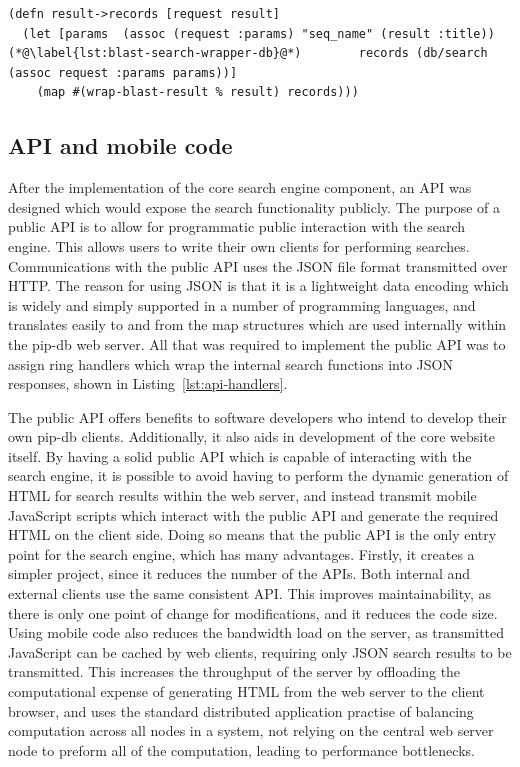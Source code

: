 \newpage


\lstset{language=clojure}
\begin{lstlisting}[label=lst:blast-search-wrapper,caption={%
      [The \textit{blast} namespace search function]
      The \textit{blast} namespace search function.}]
(defn result->records [request result]
  (let [params  (assoc (request :params) "seq_name" (result :title))
(*@\label{lst:blast-search-wrapper-db}@*)        records (db/search (assoc request :params params))]
    (map #(wrap-blast-result % result) records)))
\end{lstlisting}


\subsection{API and mobile code}\label{subsec:api}

After the implementation of the core search engine component, an API
was designed which would expose the search functionality publicly. The
purpose of a public API is to allow for programmatic public
interaction with the search engine. This allows users to write their
own clients for performing searches. Communications with the public
API uses the JSON file format transmitted over HTTP. The reason for
using JSON is that it is a lightweight data encoding which is widely
and simply supported in a number of programming languages, and
translates easily to and from the map structures which are used
internally within the pip-db web server. All that was required to
implement the public API was to assign ring handlers which wrap the
internal search functions into JSON responses, shown in
Listing~\ref{lst:api-handlers}.

The public API offers benefits to software developers who intend to
develop their own pip-db clients. Additionally, it also aids in
development of the core website itself. By having a solid public API
which is capable of interacting with the search engine, it is possible
to avoid having to perform the dynamic generation of HTML for search
results within the web server, and instead transmit mobile JavaScript
scripts which interact with the public API and generate the required
HTML on the client side. Doing so means that the public API is the
only entry point for the search engine, which has many
advantages. Firstly, it creates a simpler project, since it reduces
the number of the APIs. Both internal and external clients use the
same consistent API. This improves maintainability, as there is only
one point of change for modifications, and it reduces the code
size. Using mobile code also reduces the bandwidth load on the server,
as transmitted JavaScript can be cached by web clients, requiring only
JSON search results to be transmitted. This increases the throughput
of the server by offloading the computational expense of generating
HTML from the web server to the client browser, and uses the standard
distributed application practise of balancing computation across all
nodes in a system, not relying on the central web server node to
preform all of the computation, leading to performance bottlenecks.

